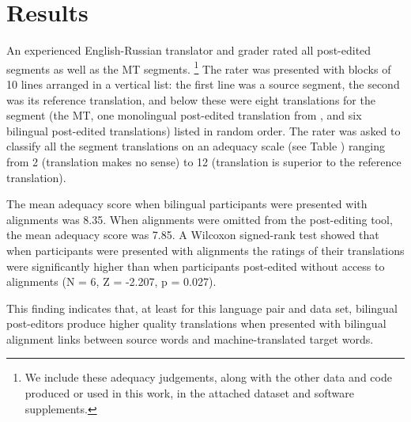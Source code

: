 





\section{Results}
\label{sec:results}




An experienced English-Russian translator and grader rated all post-edited segments as well as the MT segments.%
%
\footnote{We include these adequacy judgements, along with the other data and code produced or used in this work, in the attached dataset and software supplements.}
%
The rater was presented with blocks of 10 lines arranged in a vertical list:
%
the first line was a source segment, 
%
the second was its reference translation, and 
%
below these were eight translations for the segment 
%
(the MT, one monolingual post-edited translation from \citet{2014_WMT_Schwartz_etal}, and six bilingual post-edited translations) 
%
listed in random order. 
%
The rater was asked to classify all the segment translations on an adequacy scale (see Table ) ranging from 2 (translation makes no sense) to 12 (translation is superior to the reference translation). 







The mean adequacy score when bilingual participants were presented with alignments was 8.35.
%
When alignments were omitted from the post-editing tool, the mean adequacy score was 7.85.  
%
A Wilcoxon signed-rank test \citep{1945_Wilcoxon} showed that when participants were presented with alignments the ratings of their translations were significantly higher than when participants post-edited without access to alignments (N = 6, Z = -2.207, p = 0.027).


This finding indicates that, at least for this language pair and data set, bilingual post-editors produce higher quality translations when presented with bilingual alignment links between source words and machine-translated target words.

